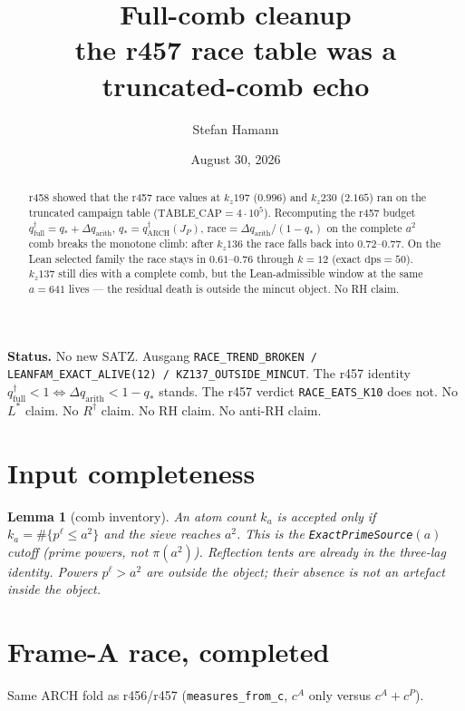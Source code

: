 \documentclass[11pt]{article}
\title{\bfseries Full-comb cleanup\\[2mm]
\large the r457 race table was a truncated-comb echo}
\author{Stefan Hamann}
\date{August 30, 2026}
\newtheorem{lemma}{Lemma}
\begin{document}
\maketitle

\begin{abstract}\noindent
r458 showed that the r457 race values at
$k_z197$ ($0.996$) and $k_z230$ ($2.165$)
ran on the truncated campaign table
($\mathrm{TABLE\_CAP}=4\cdot10^5$).
Recomputing the r457 budget
$q^{\dagger}_{\mathrm{full}}=q_*+\Delta q_{\mathrm{arith}}$,
$q_*=q^{\dagger}_{\mathrm{ARCH}}(J_P)$,
$\mathrm{race}=\Delta q_{\mathrm{arith}}/(1-q_*)$
on the complete $a^2$ comb breaks the
monotone climb: after $k_z136$ the race
falls back into $0.72$--$0.77$.
On the Lean selected family the race
stays in $0.61$--$0.76$ through $k=12$
(exact $\mathrm{dps}=50$).
$k_z137$ still dies with a complete comb,
but the Lean-admissible window at the same
$a=641$ lives --- the residual death is
outside the mincut object.
No RH claim.
\end{abstract}

\medskip\noindent
\textbf{Status.}\enspace
No new SATZ.
Ausgang
\texttt{RACE\_TREND\_BROKEN / LEANFAM\_EXACT\_ALIVE(12) / KZ137\_OUTSIDE\_MINCUT}.
The r457 identity
$q^{\dagger}_{\mathrm{full}}<1\iff\Delta q_{\mathrm{arith}}<1-q_*$
stands.  The r457 verdict
\texttt{RACE\_EATS\_K10} does not.
No $L^{*}$ claim.  No $R^{\dagger}$ claim.
No RH claim.  No anti-RH claim.

\section{Input completeness}\label{sec:inv}

\begin{lemma}[comb inventory]\label{lem:inv}
An atom count $k_a$ is accepted only if
$k_a=\#\{p^{\ell}\le a^2\}$ and the sieve
reaches $a^2$.
This is the \texttt{ExactPrimeSource}$(a)$
cutoff (prime powers, not $\pi(a^2)$).
Reflection tents are already in the
three-lag identity.
Powers $p^{\ell}>a^2$ are outside the
object; their absence is not an artefact
inside the object.
\end{lemma}

\section{Frame-A race, completed}\label{sec:A}

Same ARCH fold as r456/r457
(\texttt{measures\_from\_c}, $c^A$ only
versus $c^A+c^P$).
\end{document}
